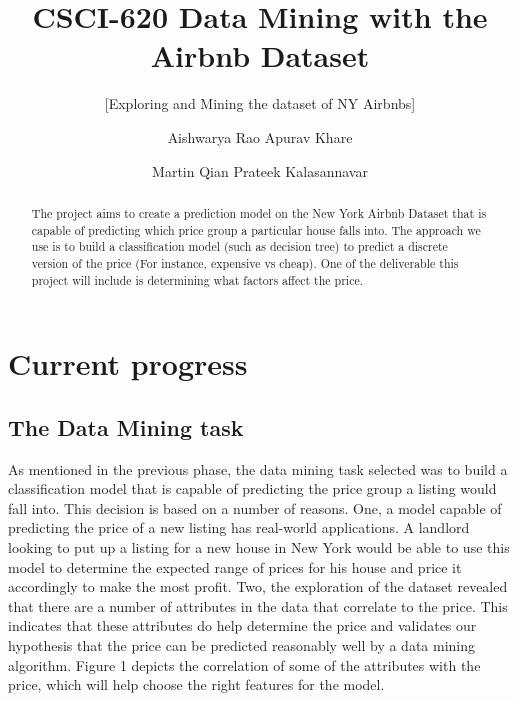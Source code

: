 \documentclass{sig-alternate}
\begin{document}
	\title{CSCI-620 Data Mining with the Airbnb Dataset}
	\subtitle{[Exploring and Mining the dataset of NY Airbnbs]}
	
	\author
	{
		\alignauthor
		Aishwarya Rao
		\alignauthor
		Apurav Khare
		\and
		\alignauthor
		Martin Qian
		\alignauthor
		Prateek Kalasannavar
	}
	
	\maketitle
	\begin{abstract}
		
		The project aims to create a prediction model on the New York Airbnb Dataset that is capable of predicting which price group a particular house falls into. The approach we use is to build a classification model (such as decision tree) to predict a discrete version of the price (For instance, expensive vs cheap). One of the deliverable this project will include is determining what factors affect the price.   
		
	\end{abstract}
	
	\section{Current progress}
	
	\subsection{The Data Mining task}
	As mentioned in the previous phase, the data mining task selected was to build a classification model that is capable of predicting the price group a listing would fall into. This decision is based on a number of reasons. One, a model capable of predicting the price of a new listing has real-world applications. A landlord looking to put up a listing for a new house in New York would be able to use this model to determine the expected range of prices for his house and price it accordingly to make the most profit. Two, the exploration of the dataset revealed that there are a number of attributes in the data that correlate to the price. This indicates that these attributes do help determine the price and validates our hypothesis that the price can be predicted reasonably well by a data mining algorithm. Figure 1 depicts the correlation of some of the attributes with the price, which will help choose the right features for the model. 
	
\end{document}
